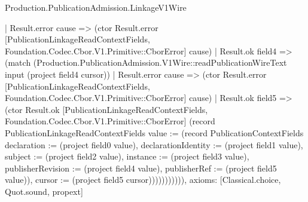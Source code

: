 \begin{lexlean}{Production.PublicationAdmission.LinkageV1Wire}
\begin{semanticmodule}
{                | Result.error cause => (ctor Result.error [PublicationLinkageReadContextFields, Foundation.Codec.Cbor.V1.Primitive::CborError] cause)
                | Result.ok field4 => (match (Production.PublicationAdmission.V1Wire::readPublicationWireText input (project field4 cursor))
                  | Result.error cause => (ctor Result.error [PublicationLinkageReadContextFields, Foundation.Codec.Cbor.V1.Primitive::CborError] cause)
                  | Result.ok field5 => (ctor Result.ok [PublicationLinkageReadContextFields, Foundation.Codec.Cbor.V1.Primitive::CborError] (record PublicationLinkageReadContextFields {value := (record PublicationContextFields {declaration := (project field0 value), declarationIdentity := (project field1 value), subject := (project field2 value), instance := (project field3 value), publisherRevision := (project field4 value), publisherRef := (project field5 value)}), cursor := (project field5 cursor)})))))))))),
  axioms: [Classical.choice, Quot.sound, propext]
}


\end{semanticmodule}
\end{lexlean}
